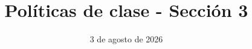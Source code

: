 \documentclass{doc}
\title{Políticas de clase - Sección 3}
\date{3 de agosto de 2026}
\begin{document}
\makedocheader






% 



\end{document}
